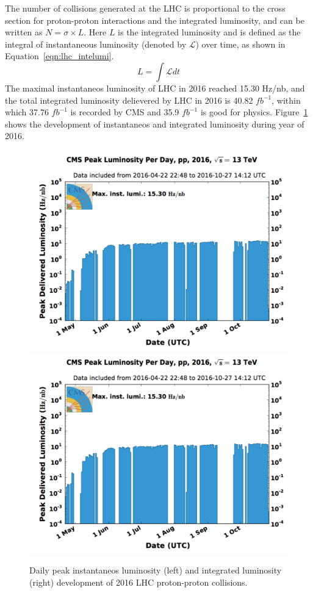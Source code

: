 \vspace{0.3cm}
The number of collisions generated at the LHC is proportional to the cross section for proton-proton interactions and the integrated luminosity, and can be written as $N=\sigma \times L$. Here $L$ is the integrated luminosity and is defined as the integral of instantaneous luminosity (denoted by $\mathcal{L}$) over time, as shown in Equation~\ref{eqn:lhc_intelumi}.
\begin{equation}
L=\int \mathcal{L}dt
\label{eqn:lhc_intelumi}
\end{equation}
The maximal instantaneos luminosity of LHC in 2016 reached 15.30 Hz/nb, and the total integrated luminosity delievered by LHC in 2016 is 40.82 $fb^{-1}$, within which 37.76 $fb^{-1}$ is recorded by CMS and 35.9 $fb^{-1}$ is good for physics. Figure~\ref{fig:lhc_lumi2016} shows the development of instantaneos and integrated luminosity during year of 2016.

\begin{figure}[htbp]
\begin{center}
\includegraphics[width=0.49\linewidth, page=1]{figures/lhc_lumi2016.pdf}
\includegraphics[width=0.49\linewidth, page=2]{figures/lhc_lumi2016.pdf}
\caption{Daily peak instantaneos luminosity (left) and integrated luminosity (right) development of 2016 LHC proton-proton collisions.}
\label{fig:lhc_lumi2016}
\end{center}
\end{figure}

